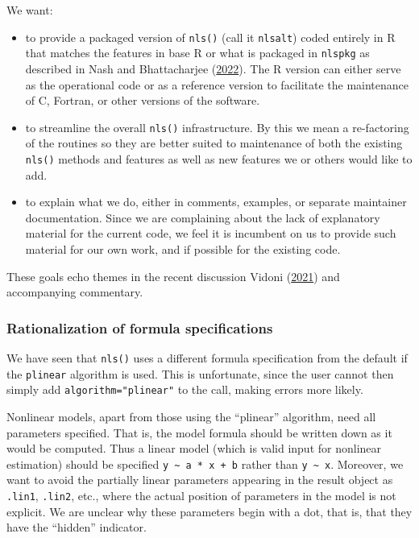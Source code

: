 \documentclass[
]{article}
\begin{document}
We want:

\begin{itemize}
\item
  to provide a packaged version of \texttt{nls()} (call it
  \texttt{nlsalt}) coded entirely in R that matches the features in base
  R or what is packaged in \texttt{nlspkg} as described in Nash and
  Bhattacharjee (\protect\hyperlink{ref-PkgFromRbase22}{2022}). The R
  version can either serve as the operational code or as a reference
  version to facilitate the maintenance of C, Fortran, or other versions
  of the software.
\item
  to streamline the overall \texttt{nls()} infrastructure. By this we
  mean a re-factoring of the routines so they are better suited to
  maintenance of both the existing \texttt{nls()} methods and features
  as well as new features we or others would like to add.
\item
  to explain what we do, either in comments, examples, or separate
  maintainer documentation. Since we are complaining about the lack of
  explanatory material for the current code, we feel it is incumbent on
  us to provide such material for our own work, and if possible for the
  existing code.
\end{itemize}

These goals echo themes in the recent discussion Vidoni
(\protect\hyperlink{ref-Vidoni21}{2021}) and accompanying commentary.

\hypertarget{rationalization-of-formula-specifications}{%
\subsubsection{Rationalization of formula
specifications}\label{rationalization-of-formula-specifications}}

We have seen that \texttt{nls()} uses a different formula specification
from the default if the \texttt{plinear} algorithm is used. This is
unfortunate, since the user cannot then simply add
\texttt{algorithm="plinear"} to the call, making errors more likely.

Nonlinear models, apart from those using the ``plinear'' algorithm, need
all parameters specified. That is, the model formula should be written
down as it would be computed. Thus a linear model (which is valid input
for nonlinear estimation) should be specified
\texttt{y\ \textasciitilde{}\ a\ *\ x\ +\ b} rather than
\texttt{y\ \textasciitilde{}\ x}. Moreover, we want to avoid the
partially linear parameters appearing in the result object as
\texttt{.lin1}, \texttt{.lin2}, etc., where the actual position of
parameters in the model is not explicit. We are unclear why these
parameters begin with a dot, that is, that they have the ``hidden''
indicator.
\end{document}
